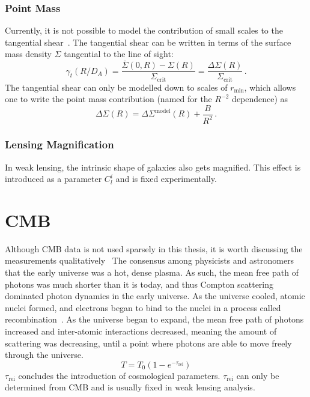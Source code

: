 \subsubsection{Point Mass}
Currently, it is not possible to model the contribution of small scales to the tangential shear~\cite{maccrann_controlling_2020}. The tangential shear can be written in terms of the surface mass density $\Sigma$ tangential to the line of sight:
\begin{equation}
	\gamma_t(R/D_A) = \frac{\bar\Sigma(0,R) - \Sigma(R)}{\Sigma_\mathrm{crit}} = \frac{\Delta\Sigma(R)}{\Sigma_\mathrm{crit}}\,.
\end{equation}
The tangential shear can only be modelled down to scales of $r_\mathrm{min}$, which allows one to write the point mass contribution (named for the $R^{-2}$ dependence) as
\begin{equation}
	\Delta\Sigma(R) = \Delta\Sigma^{\mathrm{model}}(R) + \frac{B}{R^2}\,.
\end{equation}
\subsubsection{Lensing Magnification}
In weak lensing, the intrinsic shape of galaxies also gets magnified. This effect is introduced as a parameter $C_l^i$ and is fixed experimentally.


\section{CMB}
Although CMB data is not used sparsely in this thesis, it is worth discussing the measurements qualitatively~\cite{wayne_hu_animations_nodate,joshua_frieman_cmb_nodate,wayne_hu_thermal_nodate,hu_astro_nodate} The consensus among physicists and astronomers that the early universe was a hot, dense plasma. As such, the mean free path of photons was much shorter than it is today, and thus Compton scattering dominated photon dynamics in the early universe. As the universe cooled, atomic nuclei formed, and electrons began to bind to the nuclei in a process called recombination~\cite{scott_dodelson_modern_2021,wayne_hu_animations_nodate}. As the universe began to expand, the mean free path of photons increased and inter-atomic interactions decreased, meaning the amount of scattering was decreasing, until a point where photons are able to move freely through the universe.
\begin{equation}
	T = T_0(1-e^{-\tau_{\mathrm{rei}}})
\end{equation}
$\tau_{\mathrm{rei}}$ concludes the introduction of cosmological parameters. $\tau_{\mathrm{rei}}$ can only be determined from CMB and is usually fixed in weak lensing analysis.


